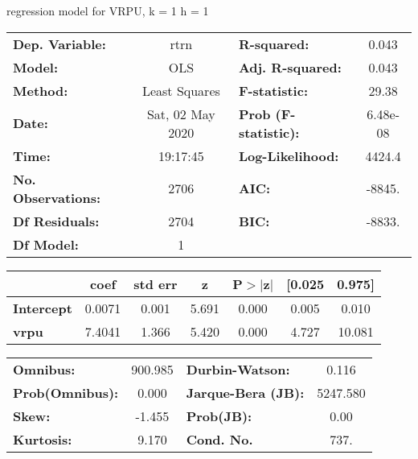 regression model for VRPU, k = 1 h = 1\begin{center}
\begin{tabular}{lclc}
\toprule
\textbf{Dep. Variable:}    &       rtrn       & \textbf{  R-squared:         } &     0.043   \\
\textbf{Model:}            &       OLS        & \textbf{  Adj. R-squared:    } &     0.043   \\
\textbf{Method:}           &  Least Squares   & \textbf{  F-statistic:       } &     29.38   \\
\textbf{Date:}             & Sat, 02 May 2020 & \textbf{  Prob (F-statistic):} &  6.48e-08   \\
\textbf{Time:}             &     19:17:45     & \textbf{  Log-Likelihood:    } &    4424.4   \\
\textbf{No. Observations:} &        2706      & \textbf{  AIC:               } &    -8845.   \\
\textbf{Df Residuals:}     &        2704      & \textbf{  BIC:               } &    -8833.   \\
\textbf{Df Model:}         &           1      & \textbf{                     } &             \\
\bottomrule
\end{tabular}
\begin{tabular}{lcccccc}
                   & \textbf{coef} & \textbf{std err} & \textbf{z} & \textbf{P$> |$z$|$} & \textbf{[0.025} & \textbf{0.975]}  \\
\midrule
\textbf{Intercept} &       0.0071  &        0.001     &     5.691  &         0.000        &        0.005    &        0.010     \\
\textbf{vrpu}      &       7.4041  &        1.366     &     5.420  &         0.000        &        4.727    &       10.081     \\
\bottomrule
\end{tabular}
\begin{tabular}{lclc}
\textbf{Omnibus:}       & 900.985 & \textbf{  Durbin-Watson:     } &    0.116  \\
\textbf{Prob(Omnibus):} &   0.000 & \textbf{  Jarque-Bera (JB):  } & 5247.580  \\
\textbf{Skew:}          &  -1.455 & \textbf{  Prob(JB):          } &     0.00  \\
\textbf{Kurtosis:}      &   9.170 & \textbf{  Cond. No.          } &     737.  \\
\bottomrule
\end{tabular}
\end{center}

